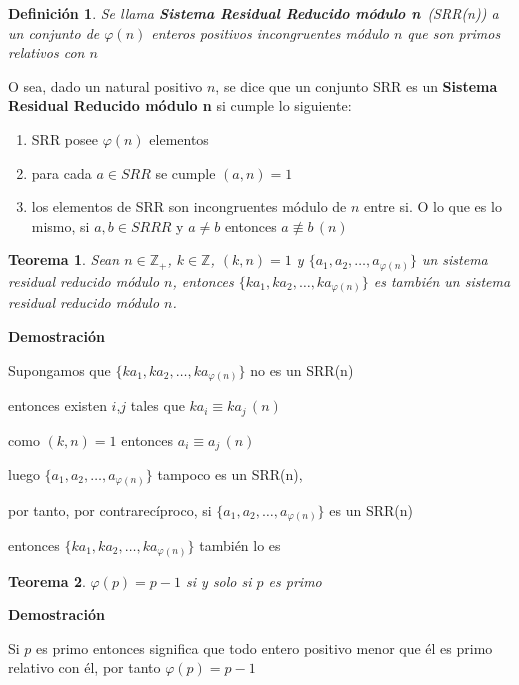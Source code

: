\documentclass[a4paper,12pt]{report}
\newtheorem*{teo}{Teorema}
\newtheorem*{dfn}{Definición}
\begin{document}
 \begin{dfn}
  Se llama \textbf{Sistema Residual Reducido módulo n}~(SRR(n)) a un conjunto de $\varphi(n)$ enteros positivos incongruentes módulo $n$ que son primos relativos con $n$
 \end{dfn}
 
 O sea, dado un natural positivo $n$, se dice que un conjunto SRR es un \textbf{Sistema Residual Reducido módulo n} si cumple lo siguiente:
 
 \begin{enumerate}
  \item SRR posee $\varphi(n)$ elementos
  \item para cada $a\in SRR$ se cumple $(a,n)=1$
  \item los elementos de SRR son incongruentes módulo de $n$ entre si. O lo que es lo mismo,  si $a,b\in SRRR$ y $a\neq b$ entonces $a\not\equiv b \, (n)$
 \end{enumerate}

 
\begin{teo}
 Sean $n\in\mathbb{Z}_+$, $k\in\mathbb{Z}$, $(k,n)=1$ y $\{a_1,a_2,\dots,a_{\varphi(n)}\}$ un sistema residual reducido módulo $n$, entonces $\{ka_1,ka_2,\dots,ka_{\varphi(n)}\}$ es también un sistema residual reducido módulo $n$.
\end{teo}

\textbf{Demostración}


Supongamos que $\{ka_1,ka_2,\dots,ka_{\varphi(n)}\}$ no es un SRR(n)

entonces existen $i$,$j$ tales que $ka_i\equiv ka_j \, (n)$

como $(k,n)=1$ entonces $a_i\equiv a_j \, (n)$

luego $\{a_1,a_2,\dots,a_{\varphi(n)}\}$ tampoco es un SRR(n), 

por tanto, por contrarecíproco, si $\{a_1,a_2,\dots,a_{\varphi(n)}\}$ es un SRR(n) 

entonces $\{ka_1,ka_2,\dots,ka_{\varphi(n)}\}$ también lo es

\begin{teo}
 $\varphi(p)=p-1$ si y solo si $p$ es primo
\end{teo}

\textbf{Demostración}

Si $p$ es primo entonces significa que todo entero positivo menor que él es primo relativo con él, por tanto $\varphi(p)=p-1$
\end{document}
